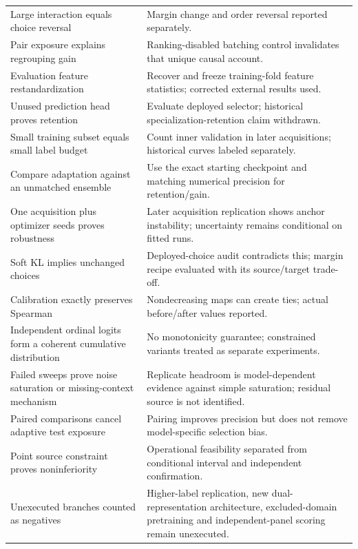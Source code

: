 \begin{longtable}{P{.29\linewidth}P{.62\linewidth}}
Large interaction equals choice reversal & Margin change and order reversal reported separately. \\
Pair exposure explains regrouping gain & Ranking-disabled batching control invalidates that unique causal account. \\
Evaluation feature restandardization & Recover and freeze training-fold feature statistics; corrected external results used. \\
Unused prediction head proves retention & Evaluate deployed selector; historical specialization-retention claim withdrawn. \\
Small training subset equals small label budget & Count inner validation in later acquisitions; historical curves labeled separately. \\
Compare adaptation against an unmatched ensemble & Use the exact starting checkpoint and matching numerical precision for retention/gain. \\
One acquisition plus optimizer seeds proves robustness & Later acquisition replication shows anchor instability; uncertainty remains conditional on fitted runs. \\
Soft KL implies unchanged choices & Deployed-choice audit contradicts this; margin recipe evaluated with its source/target trade-off. \\
Calibration exactly preserves Spearman & Nondecreasing maps can create ties; actual before/after values reported. \\
Independent ordinal logits form a coherent cumulative distribution & No monotonicity guarantee; constrained variants treated as separate experiments. \\
Failed sweeps prove noise saturation or missing-context mechanism & Replicate headroom is model-dependent evidence against simple saturation; residual source is not identified. \\
Paired comparisons cancel adaptive test exposure & Pairing improves precision but does not remove model-specific selection bias. \\
Point source constraint proves noninferiority & Operational feasibility separated from conditional interval and independent confirmation. \\
Unexecuted branches counted as negatives & Higher-label replication, new dual-representation architecture, excluded-domain pretraining and independent-panel scoring remain unexecuted. \\
\end{longtable}

